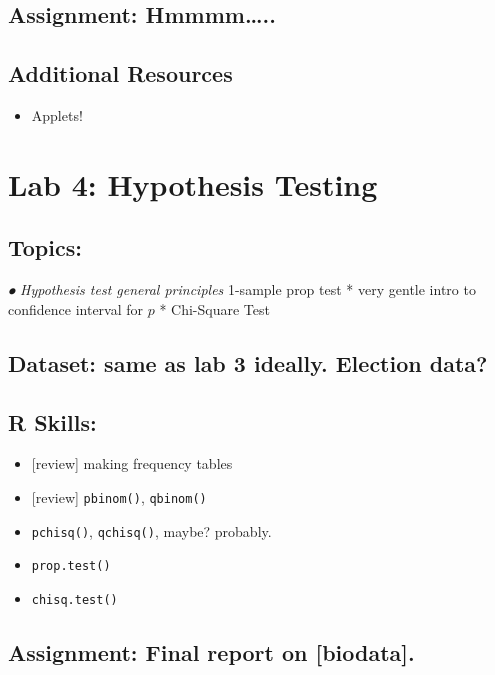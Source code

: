 \documentclass[]{article}
\providecommand{\tightlist}{%
  \setlength{\itemsep}{0pt}\setlength{\parskip}{0pt}}
\begin{document}
\subsection{Assignment: Hmmmm\ldots{}..}\label{assignment-hmmmm..}

\subsection{Additional Resources}\label{additional-resources-2}

\begin{itemize}
\tightlist
\item
  Applets!
\end{itemize}

\section{Lab 4: Hypothesis Testing}\label{lab-4-hypothesis-testing}

\subsection{Topics:}\label{topics-3}

\emph{⦁ Hypothesis test general principles } 1-sample prop test * very
gentle intro to confidence interval for \(p\) * Chi-Square Test

\subsection{Dataset: same as lab 3 ideally. Election
data?}\label{dataset-same-as-lab-3-ideally.-election-data}

\subsection{R Skills:}\label{r-skills-2}

\begin{itemize}
\tightlist
\item
  {[}review{]} making frequency tables
\item
  {[}review{]} \texttt{pbinom()}, \texttt{qbinom()}
\item
  \texttt{pchisq()}, \texttt{qchisq()}, maybe? probably.
\item
  \texttt{prop.test()}
\item
  \texttt{chisq.test()}
\end{itemize}

\subsection{Assignment: Final report on
{[}biodata{]}.}\label{assignment-final-report-on-biodata.}
\end{document}
